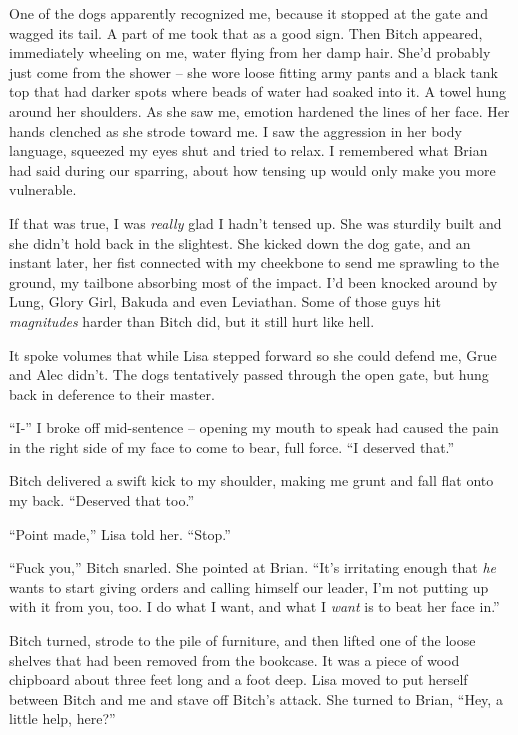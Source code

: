 One of the dogs apparently recognized me, because it stopped at the gate and wagged its tail.  A part of me took that as a good sign.  Then Bitch appeared, immediately wheeling on me, water flying from her damp hair.  She'd probably just come from the shower – she wore loose fitting army pants and a black tank top that had darker spots where beads of water had soaked into it.  A towel hung around her shoulders.  As she saw me, emotion hardened the lines of her face.  Her hands clenched as she strode toward me.  I saw the aggression in her body language, squeezed my eyes shut and tried to relax.  I remembered what Brian had said during our sparring, about how tensing up would only make you more vulnerable.



If that was true, I was \emph{really} glad I hadn't tensed up.  She was sturdily built and she didn't hold back in the slightest.  She kicked down the dog gate, and an instant later, her fist connected with my cheekbone to send me sprawling to the ground, my tailbone absorbing most of the impact.  I'd been knocked around by Lung, Glory Girl, Bakuda and even Leviathan.  Some of those guys hit \emph{magnitudes} harder than Bitch did, but it still hurt like hell.



It spoke volumes that while Lisa stepped forward so she could defend me, Grue and Alec didn't.  The dogs tentatively passed through the open gate, but hung back in deference to their master.



``I-'' I broke off mid-sentence – opening my mouth to speak had caused the pain in the right side of my face to come to bear, full force.  ``I deserved that.''



Bitch delivered a swift kick to my shoulder, making me grunt and fall flat onto my back.  ``Deserved that too.''



``Point made,'' Lisa told her. ``Stop.''



``Fuck you,'' Bitch snarled.  She pointed at Brian.  ``It's irritating enough that \emph{he} wants to start giving orders and calling himself our leader, I'm not putting up with it from you, too.  I do what I want, and what I \emph{want} is to beat her face in.''



Bitch turned, strode to the pile of furniture, and then lifted one of the loose shelves that had been removed from the bookcase.  It was  a piece of wood chipboard about three feet long and a foot deep.  Lisa moved to put herself between Bitch and me and stave off Bitch's attack.  She turned to Brian, ``Hey, a little help, here?''



